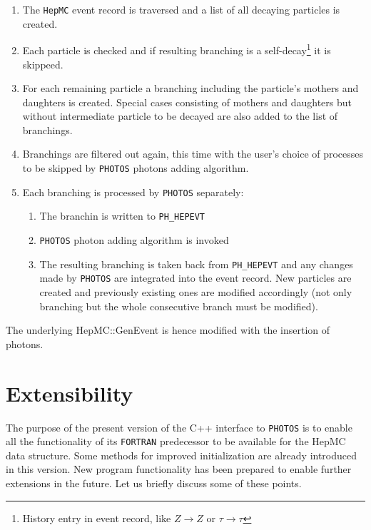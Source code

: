 \documentclass[]{Photos_interface_design}
\begin{document}
\begin{enumerate}
\item The {\tt HepMC} event record is traversed and a list of all decaying
      particles is created.
\item Each particle is checked and if resulting branching is a self-decay\footnote{History entry in event record, like
      $Z\to Z$ or $\tau \to \tau$} it is skippeed.
\item For each remaining particle a branching  including the particle's mothers and daughters
      is created. Special cases consisting of mothers and daughters but without  intermediate particle 
to be decayed are also added to the 
	  list of branchings.
\item Branchings are filtered out again, this time with  the user's choice of processes
      to be skipped by {\tt PHOTOS} photons adding algorithm.
\item Each branching  is processed by {\tt PHOTOS} separately:

	\begin{enumerate}
  
	\item The branchin  is written to {\tt PH\_HEPEVT}
	\item {\tt PHOTOS} photon adding algorithm is invoked 
 	\item The resulting branching is taken back from {\tt PH\_HEPEVT} and any changes made by {\tt PHOTOS} are 
           integrated into the event record. New particles are created and previously existing  ones are modified
		  accordingly (not only branching but the whole consecutive branch must be modified).

	\end{enumerate}

\end{enumerate}

The underlying HepMC::GenEvent is hence modified with the  insertion of photons.

\section{Extensibility}
\label{sec:extensibility}
 The purpose of the present version of the C++ interface to {\tt PHOTOS} is to enable 
all the functionality of its {\tt FORTRAN} predecessor to be available for the HepMC data
structure. Some methods for improved initialization are already introduced in this version. New program 
functionality has been prepared to enable further extensions in the future. 
Let us briefly discuss some of these points.
\end{document}

